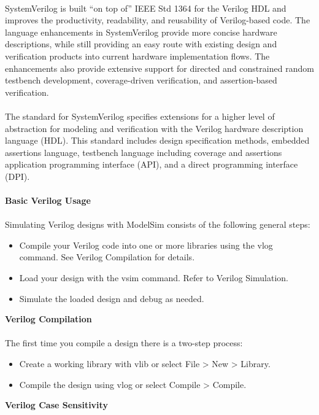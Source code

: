 \documentclass[14pt]{report}
\begin{document}
{\paragraph{} SystemVerilog is built “on top of” IEEE Std 1364 for the Verilog HDL and improves the
productivity, readability, and reusability of Verilog-based code. The language enhancements in
SystemVerilog provide more concise hardware descriptions, while still providing an easy route
with existing design and verification products into current hardware implementation flows. The
enhancements also provide extensive support for directed and constrained random testbench
development, coverage-driven verification, and assertion-based verification.
\paragraph{} The standard for SystemVerilog specifies extensions for a higher level of abstraction for
modeling and verification with the Verilog hardware description language (HDL). This
standard includes design specification methods, embedded assertions language, testbench
language including coverage and assertions application programming interface (API), and a
direct programming interface (DPI).\\
\\
\textbf{Basic Verilog Usage}
\paragraph{} Simulating Verilog designs with ModelSim consists of the following general steps:\\
\begin{itemize}
\item Compile your Verilog code into one or more libraries using the vlog command. See Verilog Compilation for details.
\item Load your design with the vsim command. Refer to Verilog Simulation.
\item Simulate the loaded design and debug as needed.
\end{itemize}
\textbf{Verilog Compilation}
\paragraph{} The first time you compile a design there is a two-step process:
\begin{itemize}
\item Create a working library with vlib or select File > New > Library.
\item Compile the design using vlog or select Compile > Compile.
\end{itemize}
\textbf{Verilog Case Sensitivity}
}
\end{document}
